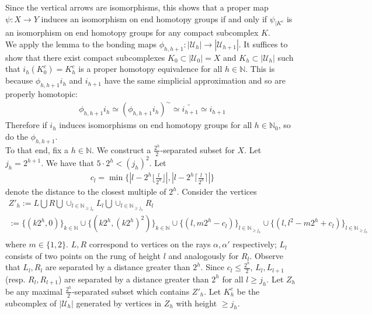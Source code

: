 \documentclass[a4paper,11pt]{article}
\theoremstyle{definition}
\theoremstyle{plain}
\theoremstyle{remark}
\begin{document}
{Since the vertical arrows are isomorphisms, this shows that a proper map $\psi: X\rightarrow Y$ induces an isomorphism on end homotopy groups if and only if $\psi_{|K^c}$ is an isomorphism on end homotopy groups for any compact subcomplex $K$. \\

We apply the lemma to the bonding maps $\phi_{h,h+1}: |\mathcal{U}_{h}|\rightarrow |\mathcal{U}_{h+1}|$. It suffices to show that there exist compact subcomplexes $K_{0} \subset |\mathcal{U}_{0}| = X$ and $K_{h} \subset |\mathcal{U}_{h}|$ such that $i_{h}(K^c_{0}) = K^c_{h}$ is a proper homotopy equivalence for all $h\in \mathbb{N}$. This is because $\phi_{h,h+1}i_{h}$ and $i_{h+1}$ have the same simplicial approximation and so are properly homotopic: 
\begin{align*}
\phi_{h,h+1}i_{h} \simeq (\phi_{h,h+1}i_{h})^{\sim}\simeq \widetilde{ i_{h+1}} \simeq  i_{h+1}
\end{align*}
Therefore if $i_{h}$ induces isomorphisms on end homotopy groups for all $h\in \mathbb{N}_{0}$, so do the $\phi_{h,h+1}$. \\


To that end, fix a $h\in \mathbb{N}$. We construct a $\frac{2^h}{2}$-separated subset for $X$. Let $j_{h} = 2^{h+1}$. We have that $5\cdot 2^{h} <(j_{h})^2$. Let
\begin{align*}
c_{l} = \min\{
|l-2^h\lfloor \frac{l}{2^h}\rfloor|,
|l-2^h\lceil \frac{l}{2^h}\rceil|
\}
\end{align*} 
denote the distance to the closest multiple of $2^h$. Consider the vertices 
\begin{align*}
Z'_{h}:= L \bigcup R \bigcup \cup_{l \in \mathbb{N}_{\geq j_{h}}} L_{l} \bigcup \cup_{l \in \mathbb{N}_{\geq j_{h}}}R_{l}\\
:= \{(k2^h,0)\}_{k\in \mathbb{N}}\cup \{(k2^h,(k2^h)^{2})\}_{k\in \mathbb{N}} \cup \{(l,m2^h-c_{l})\}_{l \in \mathbb{N}_{\geq j_{h}}}\cup  \{(l,l^2-m2^h+c_{l})\}_{l \in \mathbb{N}_{\geq j_{h}}}\\
\end{align*}
where $m\in \{1,2\}$. $L,R$ correspond to vertices on the rays $\alpha,\alpha'$ respectively; $L_{l}$ consists of two points on the rung of height $l$ and analogously for $R_{l}$. Observe that $L_{l}, R_{l}$ are separated by a distance greater than $2^h$. Since $c_{l}\leq \frac{2^h}{2}$,  $L_{l}, L_{l+1}$ (resp. $R_{l}, R_{l+1}$) are separated by a distance greater than $2^h$ for all $l\geq j_{h}$. Let $Z_{h}$ be any maximal $\frac{2^h}{2}$-separated subset which contains $Z'_{h}$. Let $K^c_{h}$ be the subcomplex of $|\mathcal{U}_{h}|$ generated by vertices in $Z_{h}$ with height $\geq {j_{h}}$.\\

}
\end{document}
